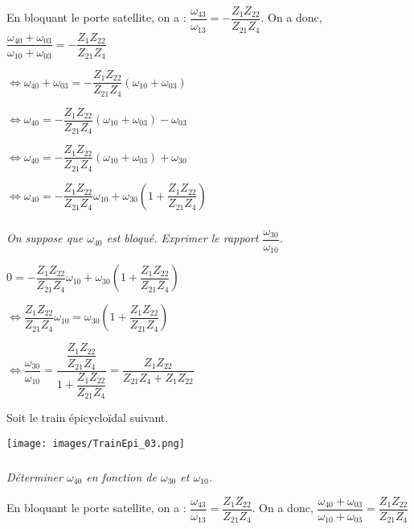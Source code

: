 \documentclass[10pt,fleqn]{article} %
\begin{document}
\begin{multicols}{2}
\begin{multicols}{2}
\begin{corrige}
 En bloquant le porte satellite, on a : $\dfrac{\omega_{43}}{\omega_{13}}=-\dfrac{Z_{1}Z_{22}}{Z_{21}Z_{4}}$.
  On a donc, 
  $\dfrac{\omega_{40}+\omega_{03}}{\omega_{10}+\omega_{03}}=-\dfrac{Z_{1}Z_{22}}{Z_{21}Z_{4}}$

  $\Leftrightarrow \omega_{40}+\omega_{03}=-\dfrac{Z_{1}Z_{22}}{Z_{21}Z_{4}}\left( \omega_{10}+\omega_{03} \right)$
  
  $\Leftrightarrow \omega_{40}=-\dfrac{Z_{1}Z_{22}}{Z_{21}Z_{4}}\left( \omega_{10}+\omega_{03} \right)-\omega_{03}$
  
    $\Leftrightarrow \omega_{40}=-\dfrac{Z_{1}Z_{22}}{Z_{21}Z_{4}}\left( \omega_{10}+\omega_{03} \right)+\omega_{30}$
    
      $\Leftrightarrow \omega_{40}=-\dfrac{Z_{1}Z_{22}}{Z_{21}Z_{4}}\omega_{10}+\omega_{30}\left( 1+\dfrac{Z_{1}Z_{22}}{Z_{21}Z_{4}} \right)$

 \end{corrige}
 \else
 \fi




\subparagraph{}
\textit{On suppose que $\omega_{40}$ est bloqué. Exprimer le rapport $\dfrac{\omega_{30}}{\omega_{10}}$.}
\ifprof
 \begin{corrige}
$0=-\dfrac{Z_{1}Z_{22}}{Z_{21}Z_{4}}\omega_{10}+\omega_{30}\left( 1+\dfrac{Z_{1}Z_{22}}{Z_{21}Z_{4}} \right)$

$\Leftrightarrow \dfrac{Z_{1}Z_{22}}{Z_{21}Z_{4}}\omega_{10}=\omega_{30}\left( 1+\dfrac{Z_{1}Z_{22}}{Z_{21}Z_{4}} \right)$


$\Leftrightarrow \dfrac{\omega_{30}}{\omega_{10}} 
= \dfrac{\dfrac{Z_{1}Z_{22}}{Z_{21}Z_{4}}}{ 1+\dfrac{Z_{1}Z_{22}}{Z_{21}Z_{4}} }
= \dfrac{Z_{1}Z_{22}}{ Z_{21}Z_{4}+Z_{1}Z_{22} }$


 \end{corrige}
 \else
 \fi



\ifprof
\else
Soit le train épicycloïdal suivant. 

\begin{center}
 \texttt{[image: images/TrainEpi\_03.png]}
\end{center}
\fi



\subparagraph{}
\textit{Déterminer $\omega_{40}$ en fonction de  $\omega_{30}$ et $\omega_{10}$.}
\ifprof
 \begin{corrige}
 
 En bloquant le porte satellite, on a : $\dfrac{\omega_{43}}{\omega_{13}}=\dfrac{Z_{1}Z_{22}}{Z_{21}Z_{4}}$.
  On a donc, 
  $\dfrac{\omega_{40}+\omega_{03}}{\omega_{10}+\omega_{03}}=
\dfrac{Z_{1}Z_{22}}{Z_{21}Z_{4}}$


\end{corrige}
\end{multicols}
\end{multicols}
\end{document}

